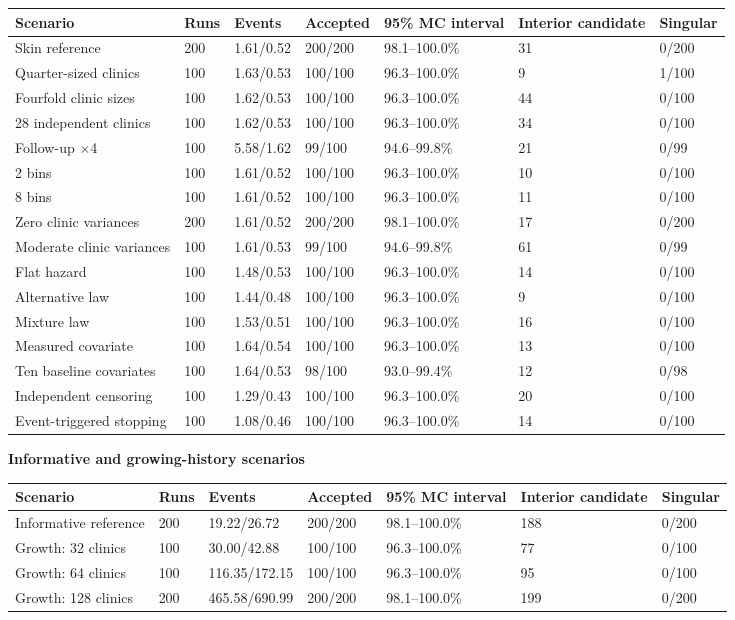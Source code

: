 \documentclass[11pt]{article}
\begin{document}
{\scriptsize\setlength{\tabcolsep}{4pt}
\begin{longtable}{lllllll}
\toprule
\textbf{Scenario} & \textbf{Runs} & \textbf{Events} & \textbf{Accepted} & \textbf{95\% MC interval} & \textbf{Interior candidate} & \textbf{Singular} \\
\midrule
\endhead
\bottomrule
\endlastfoot
Skin reference & 200 & 1.61/0.52 & 200/200 & 98.1--100.0\% & 31 & 0/200 \\
Quarter-sized clinics & 100 & 1.63/0.53 & 100/100 & 96.3--100.0\% & 9 & 1/100 \\
Fourfold clinic sizes & 100 & 1.62/0.53 & 100/100 & 96.3--100.0\% & 44 & 0/100 \\
28 independent clinics & 100 & 1.62/0.53 & 100/100 & 96.3--100.0\% & 34 & 0/100 \\
Follow-up $\times$4 & 100 & 5.58/1.62 & 99/100 & 94.6--99.8\% & 21 & 0/99 \\
2 bins & 100 & 1.61/0.52 & 100/100 & 96.3--100.0\% & 10 & 0/100 \\
8 bins & 100 & 1.61/0.52 & 100/100 & 96.3--100.0\% & 11 & 0/100 \\
Zero clinic variances & 200 & 1.61/0.52 & 200/200 & 98.1--100.0\% & 17 & 0/200 \\
Moderate clinic variances & 100 & 1.61/0.53 & 99/100 & 94.6--99.8\% & 61 & 0/99 \\
Flat hazard & 100 & 1.48/0.53 & 100/100 & 96.3--100.0\% & 14 & 0/100 \\
Alternative law & 100 & 1.44/0.48 & 100/100 & 96.3--100.0\% & 9 & 0/100 \\
Mixture law & 100 & 1.53/0.51 & 100/100 & 96.3--100.0\% & 16 & 0/100 \\
Measured covariate & 100 & 1.64/0.54 & 100/100 & 96.3--100.0\% & 13 & 0/100 \\
Ten baseline covariates & 100 & 1.64/0.53 & 98/100 & 93.0--99.4\% & 12 & 0/98 \\
Independent censoring & 100 & 1.29/0.43 & 100/100 & 96.3--100.0\% & 20 & 0/100 \\
Event-triggered stopping & 100 & 1.08/0.46 & 100/100 & 96.3--100.0\% & 14 & 0/100 \\
\end{longtable}}

\textbf{Informative and growing-history scenarios}

{\scriptsize\setlength{\tabcolsep}{4pt}
\begin{longtable}{lllllll}
\toprule
\textbf{Scenario} & \textbf{Runs} & \textbf{Events} & \textbf{Accepted} & \textbf{95\% MC interval} & \textbf{Interior candidate} & \textbf{Singular} \\
\midrule
\endhead
\bottomrule
\endlastfoot
Informative reference & 200 & 19.22/26.72 & 200/200 & 98.1--100.0\% & 188 & 0/200 \\
Growth: 32 clinics & 100 & 30.00/42.88 & 100/100 & 96.3--100.0\% & 77 & 0/100 \\
Growth: 64 clinics & 100 & 116.35/172.15 & 100/100 & 96.3--100.0\% & 95 & 0/100 \\
Growth: 128 clinics & 200 & 465.58/690.99 & 200/200 & 98.1--100.0\% & 199 & 0/200 \\
\end{longtable}}
\end{document}
